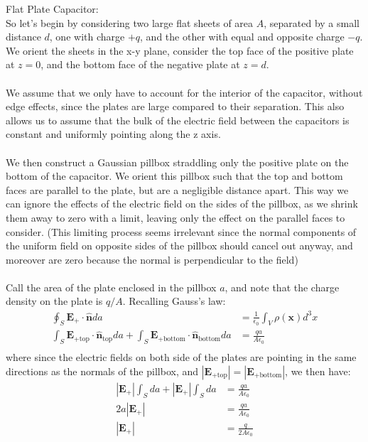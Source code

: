 \documentclass{article}
\begin{document}
Flat Plate Capacitor:\\
So let's begin by considering two large flat sheets of area $A$, separated by a small distance $d$, one with charge $+q$, and the other with equal and opposite charge $-q$. We orient the sheets in the x-y plane, consider the top face of the positive plate at $z=0$, and the bottom face of the negative plate at $z=d$.\\
\\
We assume that we only have to account for the interior of the capacitor, without edge effects, since the plates are large compared to their separation. This also allows us to assume that the bulk of the electric field between the capacitors is constant and uniformly pointing along the z axis.\\
\\
We then construct a Gaussian pillbox straddling only the positive plate on the bottom of the capacitor. We orient this pillbox such that the top and bottom faces are parallel to the plate, but are a negligible distance apart. This way we can ignore the effects of the electric field on the sides of the pillbox, as we shrink them away to zero with a limit, leaving only the effect on the parallel faces to consider. (This limiting process seems irrelevant since the normal components of the uniform field on opposite sides of the pillbox should cancel out anyway, and moreover are zero because the normal is perpendicular to the field)\\
\\
Call the area of the plate enclosed in the pillbox $a$, and note that the charge density on the plate is $q/A$. Recalling Gauss's law:
\begin{align*}
	\oint_{S} \mathbf{E}_{+}\cdot \mathbf{\hat{n}} da &= \frac{1}{\epsilon_{0}} \int_{V} \rho(\mathbf{x}) d^{3}x\\
	\int_{S} \mathbf{E}_{+\text{top}}\cdot \mathbf{\hat{n}}_{\text{top}} da + \int_{S} \mathbf{E}_{+\text{bottom}}\cdot \mathbf{\hat{n}}_{\text{bottom}} da &= \frac{qa}{A\epsilon_{0}}\\
\end{align*}
where since the electric fields on both side of the plates are pointing in the same directions as the normals of the pillbox, and $\left|\mathbf{E}_{+\text{top}}\right| = \left|\mathbf{E}_{+\text{bottom}}\right|$, we then have:
\begin{align*}
	\left|\mathbf{E}_{+}\right| \int_{S} da + \left|\mathbf{E}_{+}\right|\int_{S} da &= \frac{qa}{A\epsilon_{0}}\\
	2a \left|\mathbf{E}_{+}\right| &= \frac{qa}{A\epsilon_{0}}\\
	\left|\mathbf{E}_{+}\right| &= \frac{q}{2A\epsilon_{0}}
\end{align*}
\end{document}
